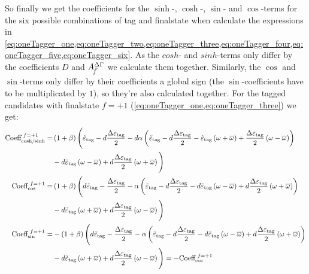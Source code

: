 So finally we get the coefficients for the $\sinh$-, $\cosh$-, $\sin$- and $\cos$-terms for the six possible combinations of tag and finalstate
when calculate the expressions in \cref{eq:oneTagger_one,eq:oneTagger_two,eq:oneTagger_three,eq:oneTagger_four,eq:oneTagger_five,eq:oneTagger_six}.
As the $cosh$- and $sinh$-terms only differ by the coefficients $D$ and $\mbox{\ensuremath{A_{\kern 1.0pt\overline{\kern -2.5pt f\kern 1.0pt}}^{\Delta\Gamma}}}$ we calculate them together. Similarly, the $\cos$ and
$\sin$-terms only differ by their coefficients a global sign (the $\sin$-coefficients have to be multiplicated by $1$), so they're also calculated together. For the tagged candidates with finalstate $f=+1$ (\cref{eq:oneTagger_one,eq:oneTagger_three}) we get:
\begin{align*}
\text{Coeff}_\text{cosh/sinh}^{\hspace{0.3em}f=+1} =& \left(1+\beta\right)\Bigg(\tilde{\varepsilon}_\text{tag}-d\frac{\Delta\varepsilon_\text{tag}}{2}
    -d\alpha\left(\tilde{\varepsilon}_\text{tag}-d\frac{\Delta\varepsilon_\text{tag}}{2}
    -\tilde{\varepsilon}_\text{tag}\left(\omega+\overline{\omega}\right)
    +\frac{\Delta\varepsilon_\text{tag}}{2}\left(\omega-\overline{\omega}\right)\right)\\
    &-d\tilde{\varepsilon}_\text{tag}\left(\omega-\overline{\omega}\right)
    +d\frac{\Delta\varepsilon_\text{tag}}{2}\left(\omega+\overline{\omega}\right)\Bigg)\\
\text{Coeff}_\text{cos}^{\hspace{0.3em}f=+1} =& \left(1+\beta\right)\Bigg(d\tilde{\varepsilon}_\text{tag}-\frac{\Delta\varepsilon_\text{tag}}{2}
    -\alpha\left(\tilde{\varepsilon}_\text{tag}-d\frac{\Delta\varepsilon_\text{tag}}{2}
    -d\tilde{\varepsilon}_\text{tag}\left(\omega-\overline{\omega}\right)
    +d\frac{\Delta\varepsilon_\text{tag}}{2}\left(\omega+\overline{\omega}\right)\right)\\
    &-d\tilde{\varepsilon}_\text{tag}\left(\omega+\overline{\omega}\right)
    +d\frac{\Delta\varepsilon_\text{tag}}{2}\left(\omega-\overline{\omega}\right)\Bigg)\\
\text{Coeff}_\text{sin}^{\hspace{0.3em}f=+1} =& -\left(1+\beta\right)\Bigg(d\tilde{\varepsilon}_\text{tag}-\frac{\Delta\varepsilon_\text{tag}}{2}
    -\alpha\left(\tilde{\varepsilon}_\text{tag}-d\frac{\Delta\varepsilon_\text{tag}}{2}
    -d\tilde{\varepsilon}_\text{tag}\left(\omega-\overline{\omega}\right)
    +d\frac{\Delta\varepsilon_\text{tag}}{2}\left(\omega+\overline{\omega}\right)\right)\\
    &-d\tilde{\varepsilon}_\text{tag}\left(\omega+\overline{\omega}\right)
    +d\frac{\Delta\varepsilon_\text{tag}}{2}\left(\omega-\overline{\omega}\right)\Bigg) = -\text{Coeff}_\text{cos}^{\hspace{0.3em}f=+1}
\end{align*}

